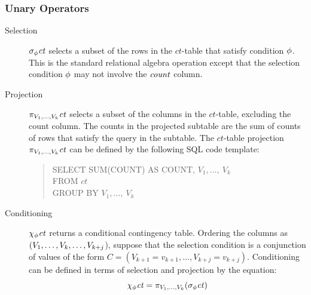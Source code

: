 \documentclass{vldb}
\newcommand{\ct}{\mathit{ct}}
\begin{document}
\subsubsection{Unary Operators} \label{sec:unary}
\begin{description}
\item[Selection] $\sigma_{\selectcond}  \ct$ selects a subset of the rows in the  $\ct$-table  that satisfy condition $\phi$. This is the standard relational algebra operation except that the selection condition $\phi$ may not involve the $\it{count}$ column.
\item[Projection]  %
$\project_{\V_{1},\ldots,\V_{k}} \ct$ selects a subset of the  columns in the  $\ct$-table, excluding the count column. 
The counts in the projected subtable are the sum of counts of rows that satisfy the query in the subtable. 
The  $\ct$-table projection  $\project_{\V_{1},\ldots,\V_{k}} \ct$ can be defined by the following SQL code template:
\begin{quote}
SELECT SUM(COUNT) AS COUNT, $V_{1}, \ldots,\ V_{k}$ \\
FROM $\ct$ \\
GROUP BY $V_{1}, \ldots,\ V_{k}$
\end{quote}
\item[Conditioning]  $\condition_{\selectcond}  \ct$ returns a conditional contingency table. Ordering the columns as $(V_{1},\ldots,V_{k}, \ldots,V_{k+j}$),  suppose that the selection condition is a conjunction of values of the form $C = (V_{k+1} = v_{k+1},\ldots, V_{k+j} = v_{k+j})$.  Conditioning can be defined in terms of selection and projection by the equation:
\begin{equation}
\condition_{\selectcond}  \ct = \project_{\V_{1},\ldots,\V_{k}} (\select_{\selectcond}  \ct) \nonumber
\end{equation}
\end{description}
\end{document}
